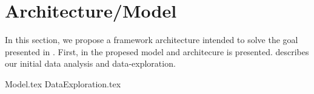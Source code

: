 \chapter{Architecture/Model}
\label{section:Architecture}

In this section, we propose a framework architecture intended to solve the goal presented in .
First, in  the propesed model and architecure is presented.
 describes our initial data analysis and data-exploration.

{Model.tex}
{DataExploration.tex}


\iffalse
  Here you will present the architecture or model that you have chosen, and that is (or will be) implemented in your work. Note that putting algorithms in your report is not desirable but in certain cases these might be placed in the appendix. Code further be avoided in the report itself but may be delivered in the fashion requested by the supervisor or, in the case of masters delivery, submitted as additional documents.
\fi
